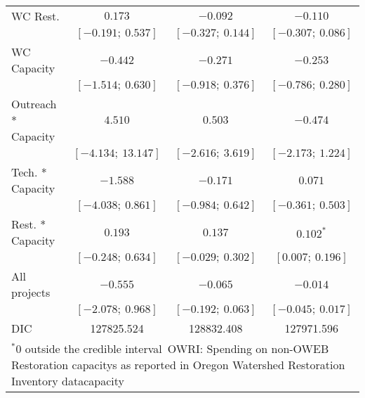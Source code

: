 \begin{table}
\begin{center}
\begin{tabular}{l c c c }
WC Rest.            & $0.173$             & $-0.092$            & $-0.110$            \\
                    & $[-0.191;\ 0.537]$  & $[-0.327;\ 0.144]$  & $[-0.307;\ 0.086]$  \\
WC Capacity         & $-0.442$            & $-0.271$            & $-0.253$            \\
                    & $[-1.514;\ 0.630]$  & $[-0.918;\ 0.376]$  & $[-0.786;\ 0.280]$  \\
Outreach * Capacity & $4.510$             & $0.503$             & $-0.474$            \\
                    & $[-4.134;\ 13.147]$ & $[-2.616;\ 3.619]$  & $[-2.173;\ 1.224]$  \\
Tech. * Capacity    & $-1.588$            & $-0.171$            & $0.071$             \\
                    & $[-4.038;\ 0.861]$  & $[-0.984;\ 0.642]$  & $[-0.361;\ 0.503]$  \\
Rest. * Capacity    & $0.193$             & $0.137$             & $0.102^{*}$         \\
                    & $[-0.248;\ 0.634]$  & $[-0.029;\ 0.302]$  & $[0.007;\ 0.196]$   \\
All projects        & $-0.555$            & $-0.065$            & $-0.014$            \\
                    & $[-2.078;\ 0.968]$  & $[-0.192;\ 0.063]$  & $[-0.045;\ 0.017]$  \\
\hline
DIC                 & 127825.524          & 128832.408          & 127971.596          \\
\hline
\multicolumn{4}{l}{\scriptsize{$^* 0$ outside the credible interval\
                           OWRI: Spending on non-OWEB Restoration capacitys as reported in Oregon Watershed Restoration Inventory datacapacity}}
\end{tabular}
\label{table:capacitymods}
\end{center}
\end{table}
